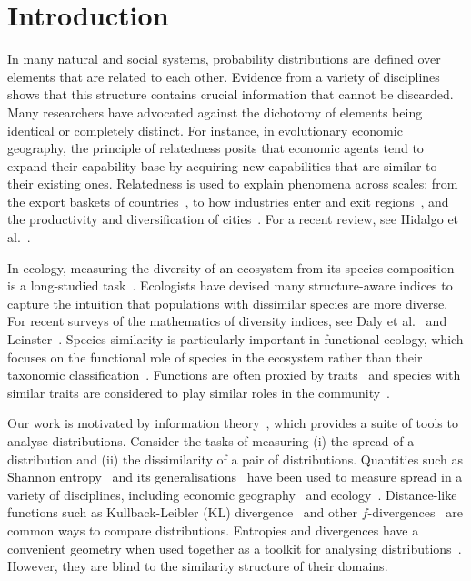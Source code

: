 \documentclass[aps,pre,floats,floatfix,superscriptaddress,twocolumn,final,10pt]{revtex4-2}
\theoremstyle{definition}
\begin{document}
\section{Introduction}
In many natural and social systems, probability distributions are defined over elements that are related to each other. Evidence from a variety of disciplines shows that this structure contains crucial information that cannot be discarded. Many researchers have advocated against the dichotomy of elements being identical or completely distinct. For instance, in evolutionary economic geography, the principle of relatedness posits that economic agents tend to expand their capability base by acquiring new capabilities that are similar to their existing ones. Relatedness is used to explain phenomena across scales: from the export baskets of countries~\cite{Hidalgo2007}, to how industries enter and exit regions~\cite{Frenken2007, Neffke2011}, and the productivity and diversification of cities~\cite{Bettencourt2014, Daniotti2025}. For a recent review, see Hidalgo et al.~\cite{Hidalgo2018}.

In ecology, measuring the diversity of an ecosystem from its species composition is a long-studied task~\cite{Jost2006}. Ecologists have devised many structure-aware indices to capture the intuition that populations with dissimilar species are more diverse. For recent surveys of the mathematics of diversity indices, see Daly et al.~\cite{Daly2018} and Leinster~\cite{Leinster2021}. Species similarity is particularly important in functional ecology, which focuses on the functional role of species in the ecosystem rather than their taxonomic classification~\cite{Daz2001, Tilman2001}. Functions are often proxied by traits~\cite{Violle2007} and species with similar traits are considered to play similar roles in the community~\cite{McGill2006}.

Our work is motivated by information theory~\cite{Cover2005}, which provides a suite of tools to analyse distributions. Consider the tasks of measuring (i) the spread of a distribution and (ii) the dissimilarity of a pair of distributions. Quantities such as Shannon entropy~\cite{Shannon1948} and its generalisations~\cite{Renyi1961,Havrda1967} have been used to measure spread in a variety of disciplines, including economic geography~\cite{Frenken2007} and ecology~\cite{Hill1973,Patil1982}. Distance-like functions such as Kullback-Leibler (KL) divergence~\cite{Kullback1951} and other $f$-divergences~\cite{Renyi1961, Csiszar1967} are common ways to compare distributions. Entropies and divergences have a convenient geometry when used together as a toolkit for analysing distributions~\cite{Cover2005, Amari2016}. However, they are blind to the similarity structure of their domains. 
\end{document}
